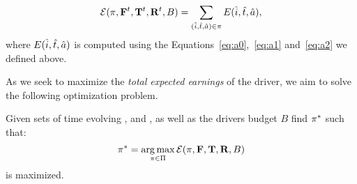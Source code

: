\begin{equation}\label{eq:totalexpectedearnings}
\mathcal{E} (\pi,{\mathbf{F}}^{t},{\mathbf{T}}^{t},{\mathbf{R}}^{t},B) = \sum_{(\hat{i},\hat{t},\hat{a})\in\pi}E({\hat{i}},{\hat{t}},{\hat{a}}),
\end{equation}
where $E({\hat{i}},{\hat{t}},{\hat{a}})$ is computed
using the Equations~\eqref{eq:a0},~\eqref{eq:a1} and~\eqref{eq:a2} we defined above.

As we seek to maximize the \emph{total expected earnings} of the driver,
we aim to solve the following optimization problem.

\begin{problem}[{\sc OptimizeEarnings}]\label{problem:theproblem}
Given sets of time evolving {\empiricaltransitionmatrix}, {\traveltimematrix} and {\rewardsmatrix}, as well as the drivers budget $B$
find $\pi^\ast$
such that:
\[
\pi^\ast = \operatorname*{arg\,max}_{\pi\in \Pi}\mathcal{E}(\pi,{\mathbf{F}},{\mathbf{T}},{\mathbf{R}},B)
\]
is maximized.
\end{problem}

